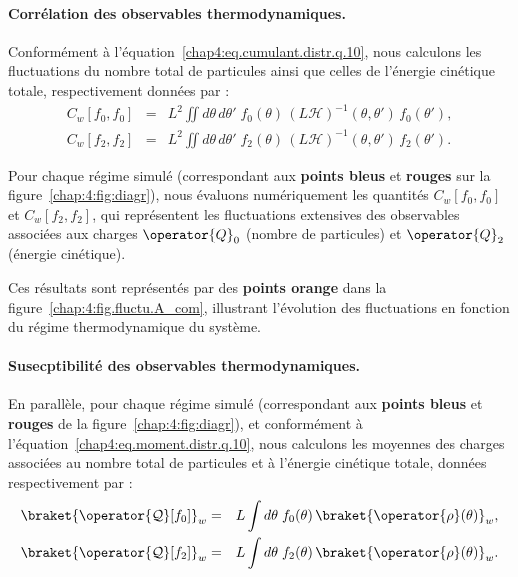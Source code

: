 \paragraph{Corrélation des observables thermodynamiques.}

\medskip
Conformément à l’équation~\eqref{chap4:eq.cumulant.distr.q.10}, nous calculons les fluctuations du nombre total de particules ainsi que celles de l’énergie cinétique totale, respectivement données par :
\begin{eqnarray}
	C_w[f_0,f_0]  & = & L^2 \iint d\theta\, d\theta'\; f_0(\theta)\, (L\mathcal{H})^{-1}(\theta , \theta')\, f_0(\theta') ,\\
	C_w[f_2,f_2]  & = & L^2 \iint d\theta\, d\theta'\; f_2(\theta)\,(L\mathcal{H})^{-1}(\theta , \theta')\, f_2(\theta').
\end{eqnarray}

Pour chaque régime simulé (correspondant aux {\bf points bleus} et {\bf rouges} sur la figure~\ref{chap:4:fig:diagr}), nous évaluons numériquement les quantités \( C_w[f_0,f_0] \) et \( C_w[f_2,f_2] \), qui représentent les fluctuations extensives des observables associées aux charges \( \operator{Q}_0 \) (nombre de particules) et \( \operator{Q}_2 \) (énergie cinétique).

\medskip

Ces résultats sont représentés par des {\bf points orange} dans la figure~\ref{chap:4:fig.fluctu.A_com}, illustrant l’évolution des fluctuations en fonction du régime thermodynamique du système.


\paragraph{Susecptibilité des observables thermodynamiques.}

\medskip
En parallèle, pour chaque régime simulé (correspondant aux {\bf points bleus} et {\bf rouges} de la figure~\ref{chap:4:fig:diagr}), et conformément à l’équation~\eqref{chap4:eq.moment.distr.q.10}, nous calculons les moyennes des charges associées au nombre total de particules et à l’énergie cinétique totale, données respectivement par :
\begin{eqnarray}
	\braket{\operator{\mathcal{Q}}[f_0]}_w & = & L \int d\theta\; f_0(\theta)\, \braket{\operator{\rho}(\theta)}_w,\\
	\braket{\operator{\mathcal{Q}}[f_2]}_w & = & L \int d\theta\; f_2(\theta)\, \braket{\operator{\rho}(\theta)}_w.
\end{eqnarray}

